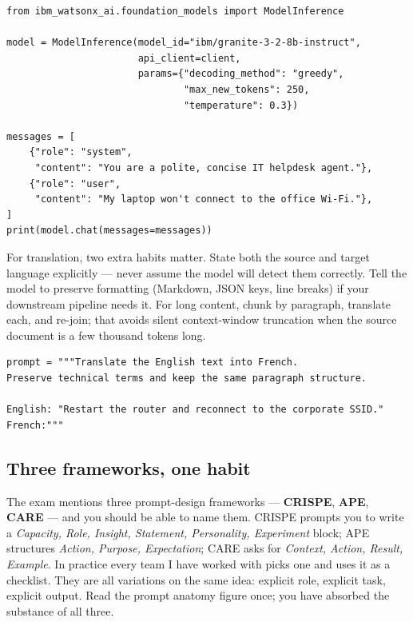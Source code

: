 \begin{examplebox}[title=\textbf{Chat-style call with system / user roles}]
\begin{lstlisting}[style=pythonstyle]
from ibm_watsonx_ai.foundation_models import ModelInference

model = ModelInference(model_id="ibm/granite-3-2-8b-instruct",
                       api_client=client,
                       params={"decoding_method": "greedy",
                               "max_new_tokens": 250,
                               "temperature": 0.3})

messages = [
    {"role": "system",
     "content": "You are a polite, concise IT helpdesk agent."},
    {"role": "user",
     "content": "My laptop won't connect to the office Wi-Fi."},
]
print(model.chat(messages=messages))
\end{lstlisting}
\end{examplebox}

For translation, two extra habits matter. State both the source and target language explicitly --- never assume the model will detect them correctly. Tell the model to preserve formatting (Markdown, JSON keys, line breaks) if your downstream pipeline needs it. For long content, chunk by paragraph, translate each, and re-join; that avoids silent context-window truncation when the source document is a few thousand tokens long.

\begin{examplebox}[title=\textbf{Translation prompt with formatting rules}]
\begin{lstlisting}[style=pythonstyle]
prompt = """Translate the English text into French.
Preserve technical terms and keep the same paragraph structure.

English: "Restart the router and reconnect to the corporate SSID."
French:"""
\end{lstlisting}
\end{examplebox}

\subsection{Three frameworks, one habit}

The exam mentions three prompt-design frameworks --- \textbf{CRISPE}, \textbf{APE}, \textbf{CARE} --- and you should be able to name them. CRISPE prompts you to write a \emph{Capacity, Role, Insight, Statement, Personality, Experiment} block; APE structures \emph{Action, Purpose, Expectation}; CARE asks for \emph{Context, Action, Result, Example}. In practice every team I have worked with picks one and uses it as a checklist. They are all variations on the same idea: explicit role, explicit task, explicit output. Read the prompt anatomy figure once; you have absorbed the substance of all three.

